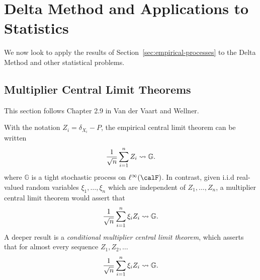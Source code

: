 \newpage
\section{Delta Method and Applications to Statistics}
\label{sec:delta-applications}

We now look to apply the results of Section~\ref{sec:empirical-processes} to the Delta Method and other statistical problems. 

\subsection{Multiplier Central Limit Theorems}%
\label{subsec:mclt}

This section follows Chapter 2.9 in Van der Vaart and Wellner. 

With the notation \(Z_i = \delta_{X_i}-P\), the empirical central limit theorem can be written
\[
    \frac{1}{\sqrt{n}} \sum_{i=1}^n Z_i \rightsquigarrow \mathbb{G}
.\] 
where \(\mathbb{G}\) is a tight stochastic process on \(\ell^\infty(\calF)\). In contrast, given i.i.d real-valued random variables \(\xi_1,\dots,\xi_n\) which are independent of \(Z_1,\dots,Z_n\), a multiplier central limit theorem would assert that 
\[
    \frac{1}{\sqrt{n}}\sum_{i=1}^n \xi_iZ_i\rightsquigarrow \mathbb{G}
.\]
A deeper result is a \emph{conditional multiplier central limit theorem}, which asserts that for almost every sequence \(Z_1,Z_2,\dots\) 
\[
    \frac{1}{\sqrt{n}}\sum_{i=1}^n \xi_iZ_i\rightsquigarrow \mathbb{G}
.\]

